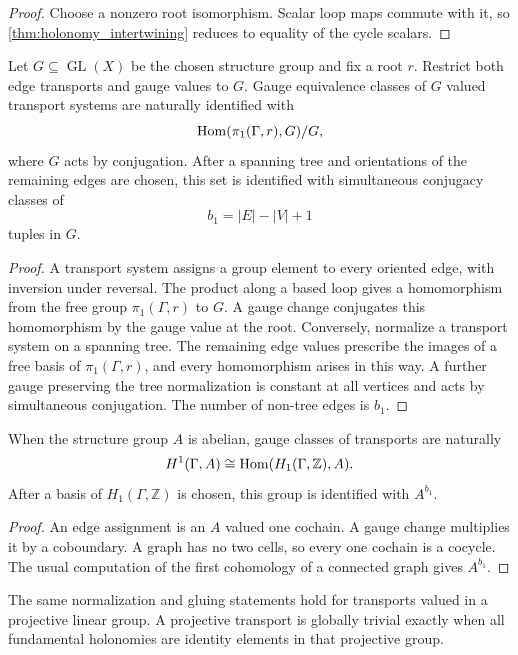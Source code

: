 \begin{proof}
Choose a nonzero root isomorphism.  Scalar loop maps commute with it, so \cref{thm:holonomy_intertwining} reduces to equality of the cycle scalars.
\end{proof}

\begin{theorem}\label{thm:gauge_classification}
Let $G\subseteq\operatorname{GL}(X)$ be the chosen structure group and fix a root $r$.  Restrict both edge transports and gauge values to $G$.  Gauge equivalence classes of $G$ valued transport systems are naturally identified with
\[
\operatorname{Hom}(\pi_1(\Gamma,r),G)/G,
\]
where $G$ acts by conjugation.  After a spanning tree and orientations of the remaining edges are chosen, this set is identified with simultaneous conjugacy classes of
\[
b_1=|E|-|V|+1
\]
tuples in $G$.
\end{theorem}

\begin{proof}
A transport system assigns a group element to every oriented edge, with inversion under reversal.  The product along a based loop gives a homomorphism from the free group $\pi_1(\Gamma,r)$ to $G$.  A gauge change conjugates this homomorphism by the gauge value at the root.  Conversely, normalize a transport system on a spanning tree.  The remaining edge values prescribe the images of a free basis of $\pi_1(\Gamma,r)$, and every homomorphism arises in this way.  A further gauge preserving the tree normalization is constant at all vertices and acts by simultaneous conjugation.  The number of non-tree edges is $b_1$.
\end{proof}

\begin{corollary}\label{cor:abelian_holonomy_class}
When the structure group $A$ is abelian, gauge classes of transports are naturally
\[
H^1(\Gamma,A)
\cong
\operatorname{Hom}(H_1(\Gamma,\mathbb Z),A).
\]
After a basis of $H_1(\Gamma,\mathbb Z)$ is chosen, this group is identified with $A^{b_1}$.
\end{corollary}

\begin{proof}
An edge assignment is an $A$ valued one cochain.  A gauge change multiplies it by a coboundary.  A graph has no two cells, so every one cochain is a cocycle.  The usual computation of the first cohomology of a connected graph gives $A^{b_1}$.
\end{proof}

\begin{corollary}\label{cor:projective_transport}
The same normalization and gluing statements hold for transports valued in a projective linear group.  A projective transport is globally trivial exactly when all fundamental holonomies are identity elements in that projective group.
\end{corollary}

